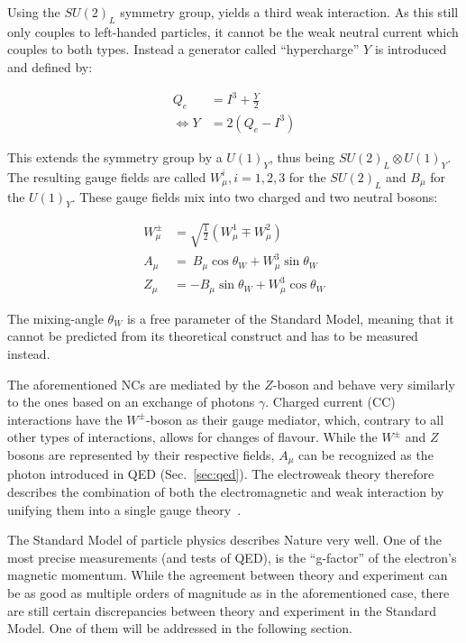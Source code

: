 Using the $SU(2)_L$ symmetry group, yields a third weak interaction. As this still only couples to left-handed particles, it cannot be the weak neutral current which couples to both types. Instead a generator called ``hypercharge'' $Y$ is introduced and defined by:

\begin{align}
  \label{eq:hypercharge}
                  Q_e &= I^3 + \frac{Y}{2} \\
  \Leftrightarrow Y   &= 2 \left( Q_e - I^3 \right)
\end{align}

\noindent This extends the symmetry group by a $U(1)_Y$, thus being $SU(2)_L \otimes U(1)_Y$. The resulting gauge fields are called $W^i_\mu, i = 1,2,3$ for the $SU(2)_L$ and $B_\mu$ for the $U(1)_Y$. These gauge fields mix into two charged and two neutral bosons:

\begin{align}
  \label{eq:ewbosons}
  W^\pm_\mu & = \sqrt{\frac{1}{2}} \left( W^1_\mu \mp W^2_\mu \right) \\
  A_\mu & = \ B_\mu \cos{\theta_W} + W^3_\mu \sin{\theta_W} \\
  Z_\mu & = - B_\mu \sin{\theta_W} + W^3_\mu \cos{\theta_W}
\end{align}
 
\noindent The mixing-angle $\theta_W$ is a free parameter of the Standard Model, meaning that it cannot be predicted from its theoretical construct and has to be measured instead.

The aforementioned NCs are mediated by the $Z$-boson and behave very similarly to the ones based on an exchange of photons $\gamma$. Charged current (CC) interactions have the $W^\pm$-boson as their gauge mediator, which, contrary to all other types of interactions, allows for changes of flavour. While the $W^\pm$ and $Z$ bosons are represented by their respective fields, $A_\mu$ can be recognized as the photon introduced in QED (Sec.~\ref{sec:qed}). The electroweak theory therefore describes the combination of both the electromagnetic and weak interaction by unifying them into a single gauge theory~\cite{standardmodel-salam,standardmodel-weinberg,standardmodel-glashow}.

The Standard Model of particle physics describes Nature very well. One of the most precise measurements (and tests of QED), is the ``g-factor'' of the electron's magnetic momentum. While the agreement between theory and experiment can be as good as multiple orders of magnitude as in the aforementioned case, there are still certain discrepancies between theory and experiment in the Standard Model. One of them will be addressed in the following section.

